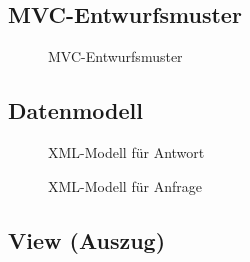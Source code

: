 \subsection{MVC-Entwurfsmuster}
\label{app:MVC}
\begin{figure}[!h]
    \centering
    \caption{MVC-Entwurfsmuster}
\end{figure}
\clearpage

\thispagestyle{empty}

\clearpage
\setcounter{subsection}{7}

\clearpage

\thispagestyle{empty}

\setcounter{subsection}{9}
\subsection{Datenmodell}
\label{app:Datenmodell}
\begin{figure}[h]
    \centering
    \caption{XML-Modell für Antwort}        
\end{figure}
\begin{figure}[!htb]
    \centering
    \caption{XML-Modell für Anfrage}
\end{figure}
\clearpage


\subsection{View (Auszug)}
\label{app:ListingView}

\clearpage

\clearpage

\clearpage

\clearpage

